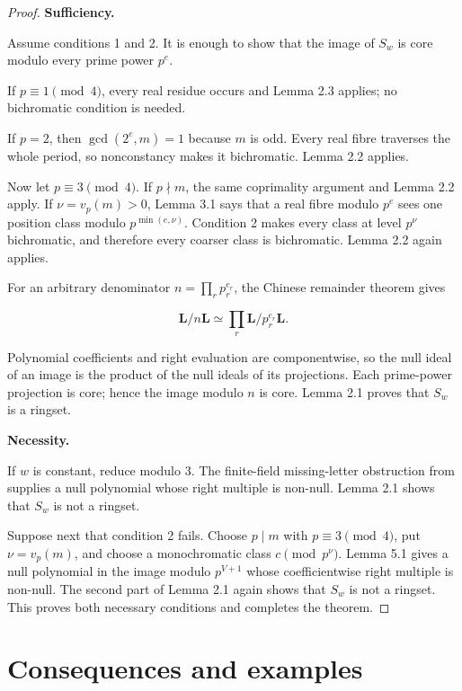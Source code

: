 \documentclass[11pt]{article}
\numberwithin{equation}{section}
\begin{document}
\begin{proof}

\medskip
\noindent\textbf{Sufficiency.}

Assume conditions 1 and 2. It is enough to show that the image of $S_w$ is
core modulo every prime power $p^e$.

If $p\equiv1\pmod4$, every real residue occurs and Lemma 2.3 applies; no
bichromatic condition is needed.

If $p=2$, then $\gcd(2^e,m)=1$ because $m$ is odd. Every real fibre traverses
the whole period, so nonconstancy makes it bichromatic. Lemma 2.2 applies.

Now let $p\equiv3\pmod4$. If $p\nmid m$, the same coprimality argument and
Lemma 2.2 apply. If $\nu=v_p(m)>0$, Lemma 3.1 says that a real fibre modulo
$p^e$ sees one position class modulo $p^{\min(e,\nu)}$. Condition 2 makes
every class at level $p^\nu$ bichromatic, and therefore every coarser class
is bichromatic. Lemma 2.2 again applies.

For an arbitrary denominator $n=\prod_rp_r^{e_r}$, the Chinese remainder
theorem gives

\[
\mathbf L/n\mathbf L
\simeq\prod_r\mathbf L/p_r^{e_r}\mathbf L.
\]

Polynomial coefficients and right evaluation are componentwise, so the null
ideal of an image is the product of the null ideals of its projections. Each
prime-power projection is core; hence the image modulo $n$ is core. Lemma
2.1 proves that $S_w$ is a ringset.

\medskip
\noindent\textbf{Necessity.}

If $w$ is constant, reduce modulo $3$. The finite-field missing-letter
obstruction from \cite[Lemma 5.1]{carptopus2026} supplies a null polynomial whose right
multiple is non-null. Lemma 2.1 shows that $S_w$ is not a ringset.

Suppose next that condition 2 fails. Choose $p\mid m$ with
$p\equiv3\pmod4$, put $\nu=v_p(m)$, and choose a monochromatic class
$c\pmod {p^\nu}$. Lemma 5.1 gives a null polynomial in the image modulo
$p^{V+1}$ whose coefficientwise right multiple is non-null. The second part
of Lemma 2.1 again shows that $S_w$ is not a ringset. This proves both
necessary conditions and completes the theorem.
\end{proof}


\section{Consequences and examples}
\end{document}
